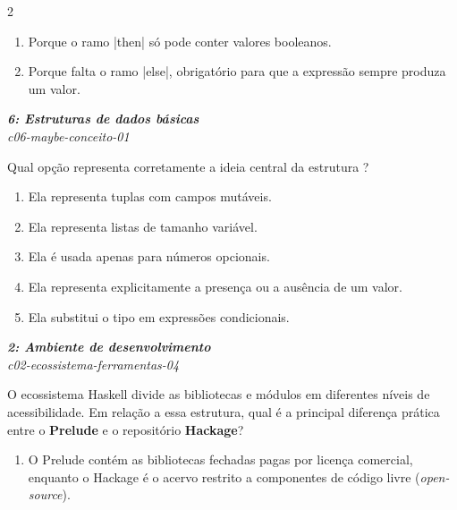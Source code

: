 \documentclass[a4paper,10pt,brazil]{article}
\begin{document}
\begin{multicols}{2}
\begin{enumerate}
  \item Porque o ramo \haskellinline|then| só pode conter valores booleanos.

  \item Porque falta o ramo \haskellinline|else|, obrigatório para que a expressão sempre produza um valor.


\end{enumerate}

\begin{flushright}
  \footnotesize
  \textit{\textbf{6: Estruturas de dados básicas}}\\
  \textit{c06-maybe-conceito-01}\\

\end{flushright}
Qual opção representa corretamente a ideia central da estrutura ?

\begin{enumerate}
  \item Ela representa tuplas com campos mutáveis.

  \item Ela representa listas de tamanho variável.

  \item Ela é usada apenas para números opcionais.

  \item Ela representa explicitamente a presença ou a ausência de um valor.

  \item Ela substitui o tipo  em expressões condicionais.


\end{enumerate}

\begin{flushright}
  \footnotesize
  \textit{\textbf{2: Ambiente de desenvolvimento}}\\
  \textit{c02-ecossistema-ferramentas-04}\\

\end{flushright}
O ecossistema Haskell divide as bibliotecas e módulos em diferentes níveis de acessibilidade. Em relação a essa estrutura, qual é a principal diferença prática entre o \textbf{Prelude} e o repositório \textbf{Hackage}?

\begin{enumerate}
  \item O Prelude contém as bibliotecas fechadas pagas por licença comercial, enquanto o Hackage é o acervo restrito a componentes de código livre (\emph{open-source}).


\end{enumerate}
\end{multicols}
\end{document}
